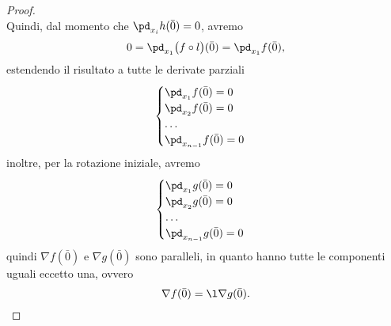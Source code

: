 \begin{proof}
\[	\]
	Quindi, dal momento che \(\pd_{x_i}h(\bar{0})=0\), avremo
	\[
		0=\pd_{x_1}\big(f\circ l\big)(\bar{0})=\pd_{x_1}f(\bar{0}),
	\]
	estendendo il risultato a tutte le derivate parziali
	\[
		\begin{cases}
			\pd_{x_1}f(\bar{0})=0 \\
			\pd_{x_2}f(\bar{0})=0 \\
			\dots                 \\
			\pd_{x_{n-1}}f(\bar{0})=0
		\end{cases}
	\]
	inoltre, per la rotazione iniziale, avremo
	\[
		\begin{cases}
			\pd_{x_1}g(\bar{0})=0 \\
			\pd_{x_2}g(\bar{0})=0 \\
			\dots                 \\
			\pd_{x_{n-1}}g(\bar{0})=0
		\end{cases}
	\]
	quindi \(\nabla f(\bar{0})\) e \(\nabla g(\bar{0})\) sono paralleli, in quanto hanno tutte le componenti uguali eccetto una, ovvero
	\[
		\nabla f(\bar{0})=\l\nabla g(\bar{0}).\qedhere
	\]
\end{proof}

